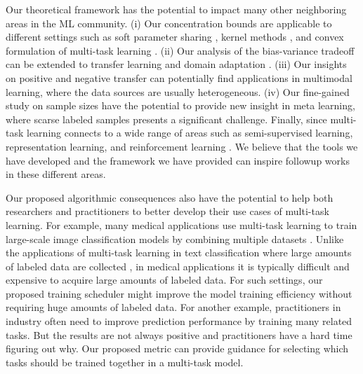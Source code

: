 Our theoretical framework has the potential to impact many other neighboring areas in the ML community.
(i) Our concentration bounds are applicable to different settings such as soft parameter sharing \cite{R17} , kernel methods \cite{EMP05}, and convex formulation of multi-task learning \cite{ZY14}.
(ii) Our analysis of the bias-variance tradeoff can be extended to transfer learning and domain adaptation \cite{K18}.
(iii) Our insights on positive and negative transfer can potentially find applications in multimodal learning, where the data sources are usually heterogeneous.
(iv) Our fine-gained study on sample sizes have the potential to provide new insight in meta learning, where scarse labeled samples presents a significant challenge.
Finally, since multi-task learning connects to a wide range of areas \cite{V20} such as semi-supervised learning, representation learning, and reinforcement learning \cite{YKGLHF20}.%
We believe that the tools we have developed and the framework we have provided can inspire followup works in these different areas.

Our proposed algorithmic consequences also have the potential to help both researchers and practitioners to better develop their use cases of multi-task learning.
For example, many medical applications use multi-task learning to train large-scale image classification models by combining multiple datasets \cite{chexnet17,EA20}.
Unlike the applications of multi-task learning in text classification where large amounts of labeled data are collected \cite{GLUE}, in medical applications it is typically difficult and expensive to acquire large amounts of labeled data.
For such settings, our proposed training scheduler might improve the model training efficiency without requiring huge amounts of labeled data.
For another example, practitioners in industry often need to improve prediction performance by training many related tasks.
But the results are not always positive and practitioners have a hard time figuring out why.
Our proposed metric can provide guidance for selecting which tasks should be trained together in a multi-task model.







